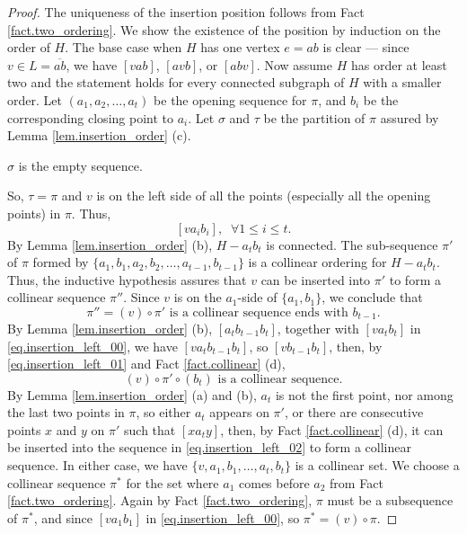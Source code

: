 \documentclass[12pt]{article}
\newcommand{\ov}{\overline}
\begin{document}
\begin{proof}
The uniqueness of the insertion position follows from Fact \ref{fact.two_ordering}.
We show the existence of the position by induction on the order of $H$. The base case when
$H$ has one vertex $e = ab$ is clear --- 
since $v \in L = \ov{ab}$, we have $[vab]$, $[avb]$, or $[abv]$.
Now assume $H$ has order at least two and the statement holds
for every connected subgraph of $H$ with a smaller order.
Let $(a_1, a_2, \dots, a_t)$ be the opening sequence for $\pi$,
and $b_i$ be the corresponding closing point to $a_i$.
Let $\sigma$ and $\tau$ be the partition of $\pi$
assured by Lemma \ref{lem.insertion_order} (c).

 $\sigma$ is the empty sequence.

So, $\tau = \pi$ and $v$ is on the left side of all the points
(especially all the opening points) in $\pi$.
Thus, 
\begin{equation}\label{eq.insertion_left_00}
[va_ib_i], \;\; \forall 1 \le i \le t.
\end{equation}
By Lemma \ref{lem.insertion_order} (b), $H - a_tb_t$ is connected.
The sub-sequence $\pi'$ of $\pi$ formed by $\{a_1, b_1, a_2, b_2, \dots, a_{t-1}, b_{t-1}\}$
is a collinear ordering for $H - a_tb_t$.
Thus, the inductive hypothesis assures that $v$ can be inserted into $\pi'$ to form
a collinear sequence $\pi''$. Since $v$ is on the $a_1$-side of $\{a_1, b_1\}$,
we conclude that
\begin{equation}\label{eq.insertion_left_01}
\mbox{$\pi'' = (v) \circ \pi'$ is a collinear sequence ends with $b_{t-1}$.}
\end{equation}
By Lemma \ref{lem.insertion_order} (b), $[a_t b_{t-1} b_t]$,
together with $[va_tb_t]$ in \eqref{eq.insertion_left_00}, we have $[va_tb_{t-1}b_t]$, so $[vb_{t-1}b_t]$,
then, by \eqref{eq.insertion_left_01} and Fact \ref{fact.collinear} (d),
\begin{equation}\label{eq.insertion_left_02}
\mbox{$(v) \circ \pi' \circ (b_t)$ is a collinear sequence.}
\end{equation}
By Lemma \ref{lem.insertion_order} (a) and (b),
$a_t$ is not the first point, nor among the last two points in $\pi$,
so either $a_t$ appears on $\pi'$, or there are consecutive points 
$x$ and $y$ on $\pi'$ such that $[xa_ty]$, then, by
Fact \ref{fact.collinear} (d), it can be inserted into the sequence in
\eqref{eq.insertion_left_02} to form a collinear sequence.
In either case, we have $\{v, a_1, b_1, \dots, a_t, b_t\}$ is a collinear set.
We choose a collinear sequence $\pi^*$ for the set where $a_1$ comes before
$a_2$ from Fact \ref{fact.two_ordering}.
Again by Fact \ref{fact.two_ordering}, $\pi$ must be a subsequence of $\pi^*$,
and since $[va_1b_1]$ in \eqref{eq.insertion_left_00}, so $\pi^* = (v) \circ \pi$.


\end{proof}
\end{document}
